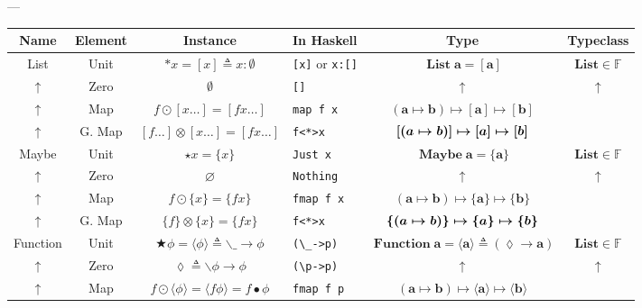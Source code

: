 \documentclass{jsarticle}
\newcommand{\boldsym}[1]{{\boldsymbol{#1}}}
\newcommand{\htypename}[1]{\mathbf{#1}}
\newcommand{\htypeclassname}[1]{\mathbb{#1}}
\begin{document}
---


\begin{center}
\begin{tabular}{||c|c||c|l|c|c||}\hline
Name&Element&Instance&In Haskell&Type&Typeclass\\\hline
\hline
List
    &Unit
    &$\ast x=[x]\triangleq x:\emptyset$
    &\texttt{[x]} or \texttt{x:[]}
    &$\mathop{\textbf{List}}\htypename{a}=\boldsym{[a]}$
    &$\textbf{List}\in\htypeclassname{F}$\\
    \hline
$\uparrow$
    &Zero
    &$\emptyset$
    &\texttt{[]}
    &$\uparrow$
    &$\uparrow$\\
    \hline
$\uparrow$
    &Map
    &$f\odot[x\dots]=[fx\dots]$
    &\texttt{map f x}
    &$(\htypename{a}\mapsto\htypename{b})\mapsto\boldsym{[a]}\mapsto\boldsym{[b]}$
    &\\
    \hline
$\uparrow$
    &G. Map
    &$[f\dots]\otimes[x\dots]=[fx\dots]$
    &\texttt{f<*>x}
    &$\boldsym{[}(\boldmath{a}\mapsto\boldmath{b})\boldsym{]}\mapsto\boldsym{[a]}\mapsto\boldsym{[b]}$
    &\\
    \hline
    \hline
Maybe
    &Unit
    &$\star x=\{x\}$
    &\texttt{Just x}
    &$\mathop{\textbf{Maybe}}\htypename{a}=\boldsym{\{a\}}$
    &$\textbf{List}\in\htypeclassname{F}$\\
    \hline
$\uparrow$
    &Zero
    &$\varnothing$
    &\texttt{Nothing}
    &$\uparrow$
    &$\uparrow$\\
    \hline
$\uparrow$
    &Map
    &$f\odot\{x\}=\{fx\}$
    &\texttt{fmap f x}
    &$(\htypename{a}\mapsto\htypename{b})\mapsto\boldsym{\{a\}}\mapsto\boldsym{\{b\}}$
    &\\
    \hline
$\uparrow$
    &G. Map
    &$\{f\}\otimes\{x\}=\{fx\}$
    &\texttt{f<*>x}
    &$\boldsym{\{}(\boldmath{a}\mapsto\boldmath{b})\boldsym{\}}\mapsto\boldsym{\{a\}}\mapsto\boldsym{\{b\}}$
    &\\
    \hline
    \hline
Function
    &Unit
    &$\bigstar\phi=\langle\phi\rangle\triangleq \backslash\_\longrightarrow\phi$
    &\verb|(\_->p)|
    &$\mathop{\textbf{Function}}\htypename{a}=\boldsym{\langle a\rangle}\triangleq(\lozenge\rightarrow\htypename{a})$
    &$\textbf{List}\in\htypeclassname{F}$\\
    \hline
$\uparrow$
    &Zero
    &$\lozenge\triangleq\backslash\phi\longrightarrow\phi$
    &\verb|(\p->p)|
    &$\uparrow$
    &$\uparrow$\\
    \hline
$\uparrow$
    &Map
    &$f\odot\langle\phi\rangle=\langle f\phi\rangle=f\bullet\phi$
    &\texttt{fmap f p}
    &$(\htypename{a}\mapsto\htypename{b})\mapsto\boldsym{\langle a\rangle}\mapsto\boldsym{\langle b\rangle}$

\end{tabular}
\end{center}
\end{document}

